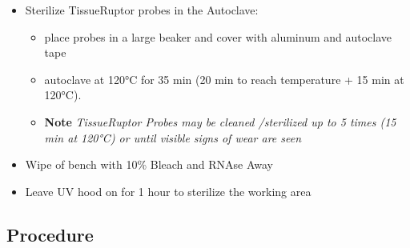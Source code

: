 \documentclass[
  letterpaper,
  DIV=11,
  numbers=noendperiod]{scrreprt}
\begin{document}

\begin{itemize}
\item
  Sterilize TissueRuptor probes in the Autoclave:

  \begin{itemize}
  \item
    place probes in a large beaker and cover with aluminum and autoclave
    tape
  \item
    autoclave at 120°C for 35 min (20 min to reach temperature + 15 min
    at 120°C).
  \item
    \textbf{Note} \emph{TissueRuptor Probes may be cleaned /sterilized
    up to 5 times (15 min at 120°C) or until visible signs of wear are
    seen}
  \end{itemize}
\item
  Wipe of bench with 10\% Bleach and RNAse Away
\item
  Leave UV hood on for 1 hour to sterilize the working area
\end{itemize}

\hypertarget{procedure-2}{%
\subsection*{\texorpdfstring{\textbf{Procedure}}{Procedure}}\label{procedure-2}}
\end{document}
